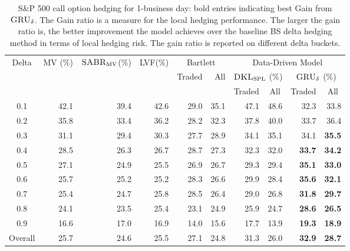 \documentclass[letterpaper,12pt,titlepage,oneside,final]{book}
\numberwithin{equation}{section}
\theoremstyle{definition}
\newcommand{\model}{\textsc{GRU}_\delta}
\newcommand{\DKLs}{\bf\textsc{DKL}_{\text{SPL}}}
\newcommand{\LVF}{\textsc{LVF}}
\newcommand{\SABR}{\bf\textsc{SABR}_{\text{MV}}}
\begin{document}
\begin{table}[htp!]
\centering
\begin{threeparttable}
\begin{tabular}{|c |r r r r r r r r r|}
\hline
\multirow{3}{*}{Delta}&\multirow{3}{*}{MV (\%)}&\multirow{3}{*}{\;$\SABR$(\%)}&\multirow{3}{*}{\LVF (\%)}&\multicolumn{2}{c|}{Bartlett}& \multicolumn{4}{c|}{Data-Driven Model}\\
&&&&\multirow{2}{*}{Traded}&\multirow{2}{*}{All}&\multicolumn{2}{|c}{$\DKLs$ (\%)} &\multicolumn{2}{c|}{$\model$ (\%)}\\
&&&&&&\multicolumn{1}{|c}{\small Traded}&\multicolumn{1}{c}{\small All}&\multicolumn{1}{c}{\small Traded}&\multicolumn{1}{c|}{\small All}\\ \hline
  0.1 & 42.1 & 39.4 & 42.6 &29.0 &35.1    & 47.1  & 48.6        &32.3          &   33.8        \\
  0.2 & 35.8 & 33.4 & 36.2 &28.2 &32.3    & 37.8  & 40.0        &33.7          &   36.4        \\
  0.3 & 31.1 & 29.4 & 30.3 &27.7 &28.9   & 34.1  & 35.1        &34.1          &\textbf{35.5}        \\
  0.4 & 28.5 & 26.3 & 26.7 &28.7 &27.3   & 32.3  & 32.0        &\textbf{33.7} &\textbf{34.2}    \\
  0.5 & 27.1 & 24.9 & 25.5 &26.9 &26.7   & 29.3  & 29.4        &\textbf{35.1} &\textbf{33.0}   \\
  0.6 & 25.7 & 25.2 & 25.2 &28.3 &26.6   & 29.9  & 28.4        &\textbf{35.6} &\textbf{32.1}    \\
  0.7 & 25.4 & 24.7 & 25.8 &28.5 &26.4   & 29.0  & 26.8        &\textbf{31.8} &\textbf{29.7}   \\
  0.8 & 24.1 & 23.5 & 25.4 &23.1 &24.9   & 25.9  & 24.7        &\textbf{28.6} &\textbf{26.5}   \\
  0.9 & 16.6 & 17.0 & 16.9 &14.0 &15.6   & 17.7  & 13.9        &\textbf{19.3} &\textbf{18.9}    \\
  Overall & 25.7 & 24.6 & 25.5 &27.1 &24.8 & 31.3  & 26.0        &\textbf{32.9} & \textbf{28.7} \\
  \hline
\end{tabular}
\caption{S\&P 500 call option hedging for 1-business day: bold entries indicating best Gain from $\model$.  The Gain ratio is a measure for the local hedging performance. The larger the gain ratio is, the better improvement the model achieves over the baseline BS delta hedging method in terms of local hedging risk. The gain ratio is reported on different delta buckets.}
\label{SP500Call}

\end{threeparttable}
\end{table}
\end{document}
